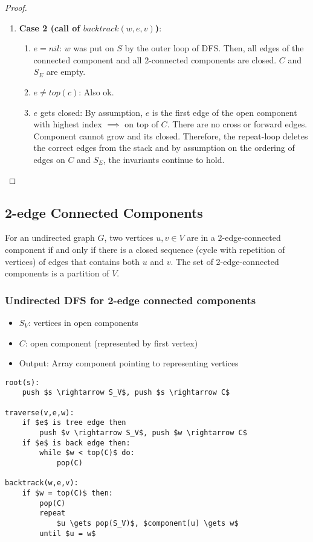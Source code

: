\begin{proof}
\begin{enumerate}
\item \textbf{Case 2 (call of $backtrack(w,e,v)$)}:
    \begin{enumerate}
    \item $e = nil$: $w$ was put on $S$ by the outer loop of DFS. Then, all edges of the connected component and all 2-connected components are closed. $C$ and $S_E$ are empty.
    \item $e \neq top(c)$: Also ok.
    \item $e$ gets closed: By assumption, $e$ is the first edge of the open component with highest index $\implies$ on top of $C$. There are no cross or forward edges. Component cannot grow and its closed. Therefore, the repeat-loop deletes the correct edges from the stack and by assumption on the ordering of edges on $C$ and $S_E$, the invariants continue to hold.  
    \end{enumerate}
\end{enumerate}

\end{proof}

\subsection{2-edge Connected Components}

\begin{mylemma}
For an undirected graph $G$, two vertices $u,v \in V$ are in a 2-edge-connected component if and only if there is a closed sequence (cycle with repetition of vertices) of edges that contains both $u$ and $v$. The set of 2-edge-connected components is a partition of $V$. 
\end{mylemma}

\subsubsection{Undirected DFS for 2-edge connected components}

\begin{itemize}
\item $S_V$: vertices in open components
\item $C$: open component (represented by first vertex)
\item Output: Array component pointing to representing vertices
\end{itemize}

\begin{lstlisting}[mathescape]
root(s):
    push $s \rightarrow S_V$, push $s \rightarrow C$

traverse(v,e,w):
    if $e$ is tree edge then
        push $v \rightarrow S_V$, push $w \rightarrow C$
    if $e$ is back edge then:
        while $w < top(C)$ do:
            pop(C)

backtrack(w,e,v):
    if $w = top(C)$ then:
        pop(C)
        repeat
            $u \gets pop(S_V)$, $component[u] \gets w$
        until $u = w$
\end{lstlisting}


